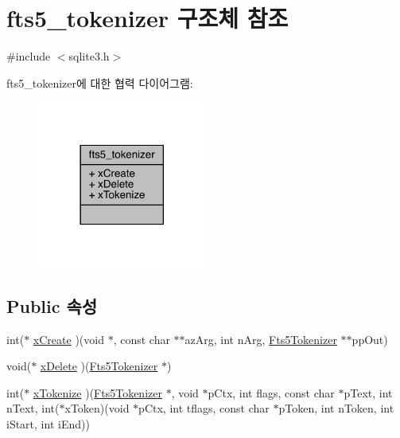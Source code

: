 \hypertarget{structfts5__tokenizer}{}\section{fts5\+\_\+tokenizer 구조체 참조}
\label{structfts5__tokenizer}


{\ttfamily \#include $<$sqlite3.\+h$>$}



fts5\+\_\+tokenizer에 대한 협력 다이어그램\+:
\nopagebreak
\begin{figure}[H]
\begin{center}
\leavevmode
\includegraphics[width=158pt]{structfts5__tokenizer__coll__graph}
\end{center}
\end{figure}
\subsection*{Public 속성}
\begin{DoxyCompactItemize}
\item 
int($\ast$ \hyperlink{structfts5__tokenizer_a61846ad000b2d38a1264c342c8201d5c}{x\+Create} )(void $\ast$, const char $\ast$$\ast$az\+Arg, int n\+Arg, \hyperlink{sqlite3_8h_ac015f88c5332d612a3125fc0014e468c}{Fts5\+Tokenizer} $\ast$$\ast$pp\+Out)
\item 
void($\ast$ \hyperlink{structfts5__tokenizer_aaaa88b9f3e50f0b1120a05fb1bbb251f}{x\+Delete} )(\hyperlink{sqlite3_8h_ac015f88c5332d612a3125fc0014e468c}{Fts5\+Tokenizer} $\ast$)
\item 
int($\ast$ \hyperlink{structfts5__tokenizer_ae65ca5a9b1e6d5c1ef09731fccefa577}{x\+Tokenize} )(\hyperlink{sqlite3_8h_ac015f88c5332d612a3125fc0014e468c}{Fts5\+Tokenizer} $\ast$, void $\ast$p\+Ctx, int flags, const char $\ast$p\+Text, int n\+Text, int($\ast$x\+Token)(void $\ast$p\+Ctx, int tflags, const char $\ast$p\+Token, int n\+Token, int i\+Start, int i\+End))
\end{DoxyCompactItemize}


